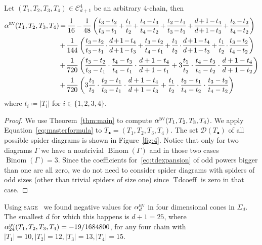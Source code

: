 \documentclass[ALCO,ThmDefs,Unicode,epreuves]{cedram}
\DeclareMathOperator{\Bi}{Binom}
\DeclareMathOperator{\Tdcoeff}{Tdcoeff}
\newcommand{\D}{{\Gamma}}
\newcommand{\CC}{\mathcal{C}}
\newcommand{\bv}{\alpha^{\textsc{bv}}}
\newcommand*{\Mk}{\mkern -2mu}
\begin{document}
\begin{prop}
	Let $(T_1,T_2,T_3,T_4)\in\CC^4_{d+1}$ be an arbitrary $4$-chain, then 
	\begin{align*}
	\bv(T_1,T_2,T_3,T_4) &\Mk =\Mk \dfrac{1}{16}\Mk -\Mk \dfrac{1}{48}\left(\dfrac{t_3\Mk -\Mk t_2}{t_3\Mk -\Mk t_1}\Mk +\Mk \dfrac{t_1}{t_2}\Mk +\Mk \dfrac{t_4\Mk -\Mk t_3}{t_4\Mk -\Mk t_2}\Mk +\Mk \dfrac{t_2\Mk -\Mk t_1}{t_3\Mk -\Mk t_1}\Mk +\Mk \dfrac{d\Mk +\Mk 1\Mk -\Mk t_4}{d\Mk +\Mk 1\Mk -\Mk t_3}\Mk +\Mk \dfrac{t_3\Mk -\Mk t_2}{t_4\Mk -\Mk t_2}\right)\\
	&\Mk +\Mk \dfrac{1}{144}\left(\dfrac{t_3\Mk -\Mk t_2}{t_3\Mk -\Mk t_1}\Mk \cdot\Mk \dfrac{d\Mk +\Mk 1\Mk -\Mk t_4}{d\Mk +\Mk 1\Mk -\Mk t_3}\Mk +\Mk \dfrac{t_3\Mk -\Mk t_2}{t_4\Mk -\Mk t_1}\Mk +\Mk \dfrac{t_1}{t_2}\Mk \cdot\Mk \dfrac{d\Mk +\Mk 1\Mk -\Mk t_4}{d\Mk +\Mk 1\Mk -\Mk t_3}\Mk +\Mk \dfrac{t_1}{t_2}\Mk \cdot\Mk \dfrac{t_3\Mk -\Mk t_2}{t_4\Mk -\Mk t_2}\right)\\
	&\Mk +\Mk \dfrac{1}{720}\left(\dfrac{t_3-t_2}{t_3-t_1}\cdot\dfrac{t_4-t_3}{t_4-t_1}\cdot\dfrac{d+1-t_4}{d+1-t_1}+3\dfrac{t_1}{t_2}\cdot\dfrac{t_4-t_3}{t_4-t_2}\cdot\dfrac{d+1-t_4}{d+1-t_2}\right)\\
	&\Mk +\Mk \dfrac{1}{720}\left(3\dfrac{t_1}{t_2}\cdot\dfrac{t_2-t_1}{t_3-t_1}\cdot\dfrac{d+1-t_4}{d+1-t_3}+\dfrac{t_1}{t_2}\cdot\dfrac{t_2-t_1}{t_4-t_2}\cdot\dfrac{t_3-t_2}{t_4-t_2}\right)
	\end{align*}
	where $t_i\coloneqq |T_i|$ for $i\in\{1,2,3,4\}$.
\end{prop}

\begin{proof}
	We use Theorem~\ref{thm:main} to compute $\bv(T_1,T_2,T_3,T_4)$. We apply Equation~\eqref{eq:masterformula} to $T_\bullet=(T_1,T_2,T_3,T_4)$. The set $\mathcal{D}(T_\bullet)$ of all possible spider diagrams is shown in Figure~\ref{fig:4}. Notice that only for two diagrams $\D$ we have a nontrivial $\Bi(\D)$ and in those two cases $\Bi(\D)=3$. Since the coefficients for~\eqref{eq:tdexpansion} of odd powers bigger than one are all zero, we do not need to consider spider diagrams with spiders of odd sizes (other than trivial spiders of size one) since $\Tdcoeff$ is zero in that case.
\end{proof}

\begin{exam}\label{ex:negative}
	Using \textsc{sage}~\cite{sagemath} we found negative values for $\bv_d$ in four dimensional cones in $\Sigma_d$. The smallest $d$ for which this happens is $d+1=25$, where $\bv_{24}(T_1,T_2,T_3,T_4)=-19/1684800$, for any four chain with $|T_1|=10,|T_2|=12,|T_3|=13, |T_4|=15$. 
\end{exam}
\end{document}
